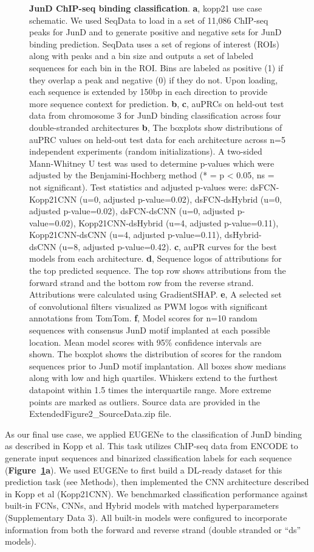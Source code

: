 \begin{figure}[p]
    \caption[JunD ChIP-seq binding classification]{\textbf{JunD ChIP-seq binding classification}. \textbf{a}, kopp21 use case schematic. We used SeqData to load in a set of 11,086 ChIP-seq peaks for JunD and to generate positive and negative sets for JunD binding prediction. SeqData uses a set of regions of interest (ROIs) along with peaks and a bin size and outputs a set of labeled sequences for each bin in the ROI. Bins are labeled as positive (1) if they overlap a peak and negative (0) if they do not. Upon loading, each sequence is extended by 150bp in each direction to provide more sequence context for prediction. \textbf{b}, \textbf{c}, auPRCs on held-out test data from chromosome 3 for JunD binding classification across four double-stranded architectures \textbf{b}, The boxplots show distributions of auPRC values on held-out test data for each architecture across n=5 independent experiments (random initializations). A two-sided Mann-Whitney U test was used to determine p-values which were adjusted by the Benjamini-Hochberg method  (* = p < 0.05, ns = not significant). Test statistics and adjusted p-values were: dsFCN-Kopp21CNN (u=0, adjusted p-value=0.02), dsFCN-dsHybrid (u=0, adjusted p-value=0.02), dsFCN-dsCNN (u=0, adjusted p-value=0.02), Kopp21CNN-dsHybrid (u=4, adjusted p-value=0.11), Kopp21CNN-dsCNN (u=4, adjusted p-value=0.11), dsHybrid-dsCNN (u=8, adjusted p-value=0.42). \textbf{c}, auPR curves for the best models from each architecture. \textbf{d}, Sequence logos of attributions for the top predicted sequence. The top row shows attributions from the forward strand and the bottom row from the reverse strand. Attributions were calculated using GradientSHAP. \textbf{e}, A selected set of convolutional filters visualized as PWM logos with significant annotations from TomTom. \textbf{f}, Model scores for n=10 random sequences with consensus JunD motif implanted at each possible location. Mean model scores with 95\% confidence intervals are shown. The boxplot shows the distribution of scores for the random sequences prior to JunD motif implantation. All boxes show medians along with low and high quartiles. Whiskers extend to the furthest datapoint within 1.5 times the interquartile range. More extreme points are marked as outliers. Source data are provided in the ExtendedFigure2\_SourceData.zip file.}
    \label{fig:4 Figure 4}
\end{figure}

As our final use case, we applied EUGENe to the classification of JunD binding as described in Kopp et al\cite{Kopp2020-fw}. This task utilizes ChIP-seq data from ENCODE\cite{ENCODE_Project_Consortium2012-tn} to generate input sequences and binarized classification labels for each sequence (\textbf{Figure~\ref{fig:4 Figure 4}a}). We used EUGENe to first build a DL-ready dataset for this prediction task (see Methods), then implemented the CNN architecture described in Kopp et al (Kopp21CNN). We benchmarked classification performance against built-in FCNs, CNNs, and Hybrid models with matched hyperparameters (Supplementary Data 3). All built-in models were configured to incorporate information from both the forward and reverse strand (double stranded or “ds” models). 

